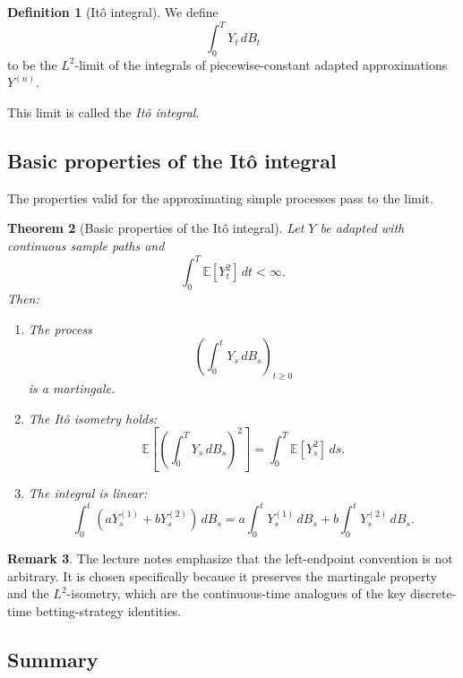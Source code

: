 \documentclass[11pt]{article}
\newtheorem{theorem}{Theorem}[section]
\theoremstyle{definition}
\newtheorem{definition}[theorem]{Definition}
\newtheorem{remark}[theorem]{Remark}
\begin{document}
\begin{definition}[It\^o integral]
We define
\[
\int_0^T Y_t\,dB_t
\]
to be the \(L^2\)-limit of the integrals of piecewise-constant adapted approximations \(Y^{(n)}\).
\end{definition}

This limit is called the \emph{It\^o integral}.

\subsection{Basic properties of the It\^o integral}

The properties valid for the approximating simple processes pass to the limit.

\begin{theorem}[Basic properties of the It\^o integral]
Let \(Y\) be adapted with continuous sample paths and
\[
\int_0^T \mathbb E[Y_t^2]\,dt<\infty.
\]
Then:
\begin{enumerate}[label=\arabic*.]
    \item The process
    \[
    \left(\int_0^t Y_s\,dB_s\right)_{t\ge 0}
    \]
    is a martingale.
    \item The It\^o isometry holds:
    \[
    \mathbb E\!\left[\left(\int_0^T Y_s\,dB_s\right)^2\right]
    =
    \int_0^T \mathbb E[Y_s^2]\,ds.
    \]
    \item The integral is linear:
    \[
    \int_0^t (aY_s^{(1)}+bY_s^{(2)})\,dB_s
    =
    a\int_0^t Y_s^{(1)}\,dB_s
    +
    b\int_0^t Y_s^{(2)}\,dB_s.
    \]
\end{enumerate}
\end{theorem}

\begin{remark}
The lecture notes emphasize that the left-endpoint convention is not arbitrary. It is chosen specifically because it preserves the martingale property and the \(L^2\)-isometry, which are the continuous-time analogues of the key discrete-time betting-strategy identities.
\end{remark}

\subsection{Summary}
\end{document}

